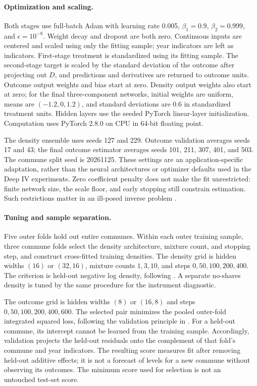 \documentclass{article}
\begin{document}
\paragraph{Optimization and scaling.}
Both stages use full-batch Adam with learning rate 0.005, $\beta_1=0.9$, $\beta_2=0.999$, and $\epsilon=10^{-8}$. Weight decay and dropout are both zero. Continuous inputs are centered and scaled using only the fitting sample; year indicators are left as indicators. First-stage treatment is standardized using its fitting sample. The second-stage target is scaled by the standard deviation of the outcome after projecting out $D$, and predictions and derivatives are returned to outcome units. Outcome output weights and bias start at zero. Density output weights also start at zero; for the final three-component networks, initial weights are uniform, means are $(-1.2,0,1.2)$, and standard deviations are 0.6 in standardized treatment units. Hidden layers use the seeded PyTorch linear-layer initialization. Computation uses PyTorch 2.8.0 on CPU in 64-bit floating point.

The density ensemble uses seeds 127 and 229. Outcome validation averages seeds 17 and 43; the final outcome estimator averages seeds 101, 211, 307, 401, and 503. The commune split seed is 20261125. These settings are an application-specific adaptation, rather than the neural architectures or optimizer defaults used in the Deep IV experiments. Zero coefficient penalty does not make the fit unrestricted: finite network size, the scale floor, and early stopping still constrain estimation. Such restrictions matter in an ill-posed inverse problem \cite{neweypowell}.

\paragraph{Tuning and sample separation.}
Five outer folds hold out entire communes. Within each outer training sample, three commune folds select the density architecture, mixture count, and stopping step, and construct cross-fitted training densities. The density grid is hidden widths $(16)$ or $(32,16)$, mixture counts $1,3,10$, and steps $0,50,100,200,400$. The criterion is held-out negative log density, following \cite[eq. (13)]{deepiv}. A separate no-shares density is tuned by the same procedure for the instrument diagnostic.

The outcome grid is hidden widths $(8)$ or $(16,8)$ and steps $0,50,100,200,400,600$. The selected pair minimizes the pooled outer-fold integrated squared loss, following the validation principle in \cite[eq. (14)]{deepiv}. For a held-out commune, its intercept cannot be learned from the training sample. Accordingly, validation projects the held-out residuals onto the complement of that fold's commune and year indicators. The resulting score measures fit after removing held-out additive effects; it is not a forecast of levels for a new commune without observing its outcomes. The minimum score used for selection is not an untouched test-set score.
\end{document}
